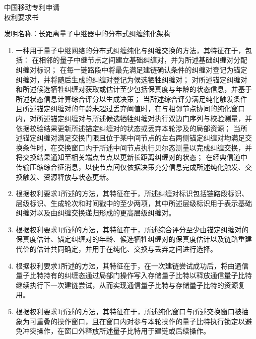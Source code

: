 \documentclass[12pt,a4paper]{article}
\begin{document}
\begin{center}
    {\Huge\heiti 中国移动专利申请} \\[0.5em]
    {\Huge\heiti 权利要求书} \\[1em]
\end{center}

\noindent
发明名称：长距离量子中继器中的分布式纠缠纯化架构

\vspace{0.5em}

\begin{enumerate}[label=\arabic*.,leftmargin=2em,itemsep=0.6em]
    \item 一种用于量子中继网络的分布式纠缠纯化与纠缠交换的方法，其特征在于，包括：
    在相邻的量子中继节点之间建立基础纠缠对，并为所述基础纠缠对分配纠缠对标识；
    在每一链路段中将最先满足建链确认条件的纠缠对登记为锚定纠缠对，并将随后生成的纠缠对登记为候选牺牲纠缠对；
    对所述锚定纠缠对和所述候选牺牲纠缠对获取或估计至少包括保真度与年龄的状态信息，并基于所述状态信息计算综合评分以生成决策；
    当所述综合评分满足纯化触发条件且所述锚定纠缠对的年龄未超过丢弃阈值时，在与相邻节点协同的纯化窗口内，对所述锚定纠缠对与所述候选牺牲纠缠对执行双边门序列与校验测量，并依据校验结果更新所述锚定纠缠对的状态或丢弃本轮涉及的局部资源；
    当所述锚定纠缠对满足交换门限且位于某中间节点的左右两侧锚定纠缠对均满足交换条件时，在交换窗口内于所述中间节点执行贝尔态测量以完成纠缠交换，并将交换结果通知至相关端点节点以更新长距离纠缠对的状态；
    在经典信道中传输压缩综合征消息，以使节点间仅依据决策充分信息完成所述纯化触发、交换触发、资源释放与状态更新。

    \item 根据权利要求1所述的方法，其特征在于，所述纠缠对标识包括链路段标识、层级标识、生成轮次和时间戳中的至少两项，其中所述层级标识用于表示基础纠缠对以及由纠缠交换递归形成的更高层级纠缠对。

    \item 根据权利要求1所述的方法，其特征在于，所述综合评分至少由锚定纠缠对的保真度估计、锚定纠缠对的年龄、候选牺牲纠缠对的保真度估计以及链路重建代价的估计共同确定，并用于在纯化、交换与丢弃之间进行选择。

    \item 根据权利要求1所述的方法，其特征在于，在一次建链尝试成功后，将由通信量子比特持有的纠缠态通过局部门操作写入存储量子比特以释放通信量子比特继续执行下一次建链尝试，从而实现通信量子比特与存储量子比特的资源复用。

    \item 根据权利要求1所述的方法，其特征在于，所述纯化窗口与所述交换窗口被抽象为可重叠的操作窗口，且在窗口内对参与本轮操作的量子比特执行锁定以避免冲突操作，在窗口外释放所述量子比特用于建链或后续操作。


\end{enumerate}
\end{document}
